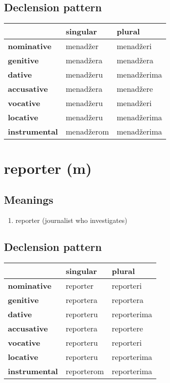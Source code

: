 \subsection*{Declension pattern}
\begin{tabularx}{\linewidth}{Xll}
\toprule
{} &    singular &       plural \\
\midrule
\textbf{nominative  } &    menadžer &    menadžeri \\
\textbf{genitive    } &   menadžera &    menadžera \\
\textbf{dative      } &   menadžeru &  menadžerima \\
\textbf{accusative  } &   menadžera &    menadžere \\
\textbf{vocative    } &   menadžeru &    menadžeri \\
\textbf{locative    } &   menadžeru &  menadžerima \\
\textbf{instrumental} &  menadžerom &  menadžerima \\
\bottomrule
\end{tabularx}

\filbreak
\section{reporter (m)}
\subsection*{Meanings}
\begin{enumerate}
\item reporter (journalist who investigates)
\end{enumerate}
\subsection*{Declension pattern}
\begin{tabularx}{\linewidth}{Xll}
\toprule
{} &    singular &       plural \\
\midrule
\textbf{nominative  } &    reporter &    reporteri \\
\textbf{genitive    } &   reportera &    reportera \\
\textbf{dative      } &   reporteru &  reporterima \\
\textbf{accusative  } &   reportera &    reportere \\
\textbf{vocative    } &   reporteru &    reporteri \\
\textbf{locative    } &   reporteru &  reporterima \\
\textbf{instrumental} &  reporterom &  reporterima \\
\bottomrule
\end{tabularx}

